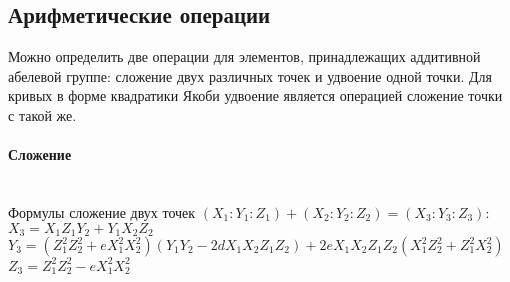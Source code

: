 \documentclass[a4paper,12pt]{article}
\begin{document}
	\subsection{Арифметические операции}
	Можно определить две операции для элементов, принадлежащих аддитивной абелевой группе: сложение двух различных точек и удвоение одной точки. Для кривых в форме квадратики Якоби удвоение является операцией сложение точки с такой же.\\
	
	\paragraph*{Сложение}
	\noindent\\
	Формулы сложение двух точек $(X_1 : Y_1 : Z_1) + (X_2 : Y_2 : Z_2) = (X_3 : Y_3 : Z_3)$:\\
	$X_3 = X_1Z_1Y_2 + Y_1X_2Z_2$\\
	$Y_3 = (Z_1^2Z_2^2+eX_1^2X_2^2)(Y_1Y_2-2dX_1X_2Z_1Z_2) + 2eX_1X_2Z_1Z_2(X_1^2Z_2^2+Z_1^2X_2^2)$\\
	$Z_3 = Z_1^2Z_2^2-eX_1^2X_2^2$\\
	
\end{document}

